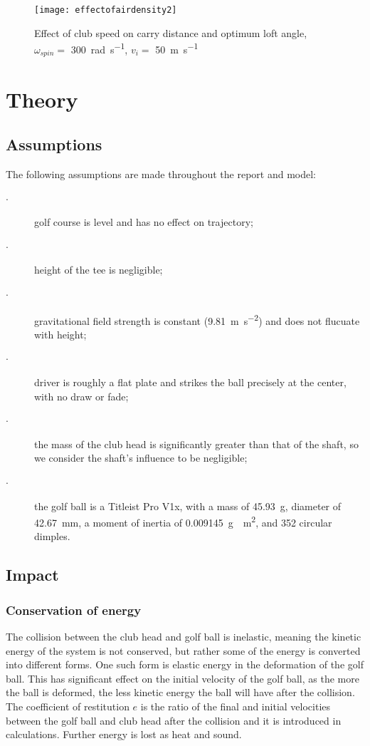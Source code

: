 \documentclass[12pt]{article}
\begin{document}
\begin{figure}[H]
\centering
\caption{Effect of club speed on carry distance and optimum loft angle, $\omega_{spin}=$ \SI{300}{\radian\per\second}, $v_i =$ \SI{50}{\metre\per\second}}
\texttt{[image: effectofairdensity2]}
\end{figure}

\section{Theory}

\subsection{Assumptions}
The following assumptions are made throughout the report and model:
\begin{description}
  \item[$\cdot$] golf course is level and has no effect on trajectory;
  \item[$\cdot$] height of the tee is negligible;
  \item[$\cdot$] gravitational field strength is constant (\SI{9.81}{\metre\per\second^{2}}) and does not flucuate with height;
  \item[$\cdot$] driver is roughly a flat plate and strikes the ball precisely at the center, with no draw or fade;
  \item[$\cdot$] the mass of the club head is significantly greater than that of the shaft, so we consider the shaft's influence to be negligible;
  \item[$\cdot$] the golf ball is a Titleist Pro V1x, with a mass of \SI{45.93}{\gram}, diameter of \SI{42.67}{\milli\metre}, a moment of inertia of \SI{0.009145}{\gram\cdot\metre^2}, and 352 circular dimples.
\end{description}

\subsection{Impact}
\subsubsection{Conservation of energy}
The collision between the club head and golf ball is inelastic, meaning the kinetic energy of the system is not conserved, but rather some of the energy is converted into different forms. One such form is elastic energy in the deformation of the golf ball. This has significant effect on the initial velocity of the golf ball, as the more the ball is deformed, the less kinetic energy the ball will have after the collision. The coefficient of restitution $e$ is the ratio of the final and initial velocities between the golf ball and club head after the collision and it is introduced in calculations. Further energy is lost as heat and sound.
\end{document}
